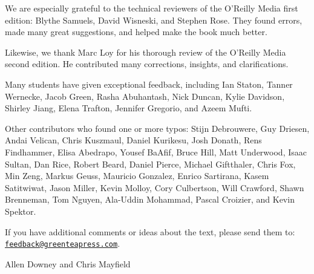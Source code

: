 We are especially grateful to the technical reviewers of the O'Reilly Media first edition: Blythe Samuels, David Wisneski, and Stephen Rose.
They found errors, made many great suggestions, and helped make the book much better.

Likewise, we thank Marc Loy for his thorough review of the O'Reilly Media second edition.
He contributed many corrections, insights, and clarifications.

Many students have given exceptional feedback, including Ian Staton, Tanner Wernecke, Jacob Green, Rasha Abuhantash, Nick Duncan, Kylie Davidson, Shirley Jiang, Elena Trafton, Jennifer Gregorio, and Azeem Mufti.

Other contributors who found one or more typos: Stijn Debrouwere, Guy Driesen, Andai Velican, Chris Kuszmaul, Daniel Kurikesu, Josh Donath, Rens Findhammer, Elisa Abedrapo, Yousef BaAfif, Bruce Hill, Matt Underwood, Isaac Sultan, Dan Rice, Robert Beard, Daniel Pierce, Michael Giftthaler, Chris Fox, Min Zeng, Markus Geuss, Mauricio Gonzalez, Enrico Sartirana, Kasem Satitwiwat, Jason Miller, Kevin Molloy, Cory Culbertson, Will Crawford, Shawn Brenneman, Tom Nguyen, Ala-Uddin Mohammad, Pascal Croizier, and Kevin Spektor.


If you have additional comments or ideas about the text, please send them to: \href{mailto:feedback@greenteapress.com}{\tt feedback@greenteapress.com}.

\hfill Allen Downey and Chris Mayfield
